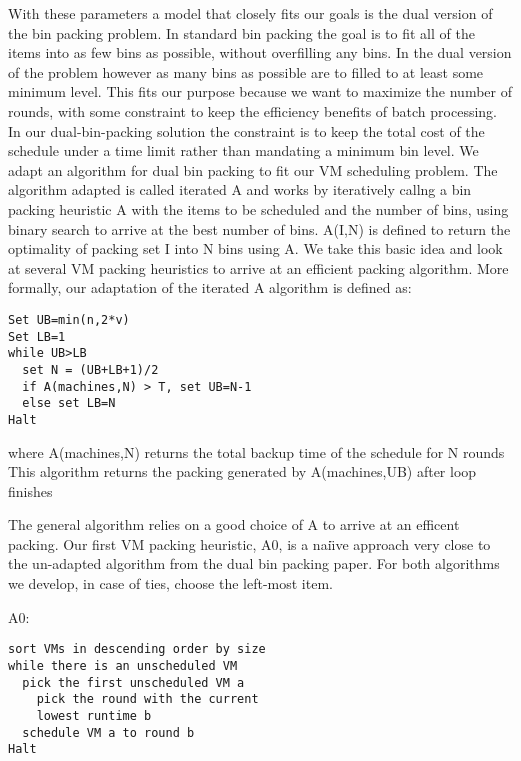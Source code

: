 With these parameters a model that closely fits our goals is the dual version
of the
bin packing problem. In standard bin packing the goal is to fit all of the
items into as few bins as possible, without overfilling any bins. In the dual
version of the problem however as many bins as possible are to filled to at
least some minimum level. This fits our purpose because we want to maximize the
number of rounds, with some constraint to keep the efficiency benefits of batch
processing. In our dual-bin-packing solution the constraint is to keep the total
cost of the schedule under a time limit rather than mandating a minimum bin
level. We
adapt an algorithm for dual bin packing\cite{DualBinPacking} to fit our VM
scheduling problem. The algorithm adapted is called iterated A and works by
iteratively callng a bin packing heuristic A with the items to be scheduled and
the number of bins, using binary search to arrive at the best number of
bins. A(I,N) is defined to return the optimality of packing set I into N bins
using A. We take this basic idea and look at several VM packing heuristics to
arrive at an efficient packing algorithm. More formally, our adaptation of the
iterated A algorithm is defined as:


\begin{lstlisting}
Set UB=min(n,2*v)
Set LB=1
while UB>LB
  set N = (UB+LB+1)/2
  if A(machines,N) > T, set UB=N-1
  else set LB=N
Halt
\end{lstlisting}
where A(machines,N) returns the total backup time of the schedule for N rounds\\
This algorithm returns the packing generated by A(machines,UB) after loop finishes

The general algorithm relies on a good choice of A to arrive at an efficent
packing. Our first VM packing heuristic, A0, is a nai\"\i{}ve approach very
close to the un-adapted algorithm from the dual bin packing paper. For both
algorithms we develop, in case of ties, choose the left-most item.

A0:
\begin{lstlisting}
sort VMs in descending order by size
while there is an unscheduled VM
  pick the first unscheduled VM a
    pick the round with the current
    lowest runtime b
  schedule VM a to round b
Halt
\end{lstlisting}

